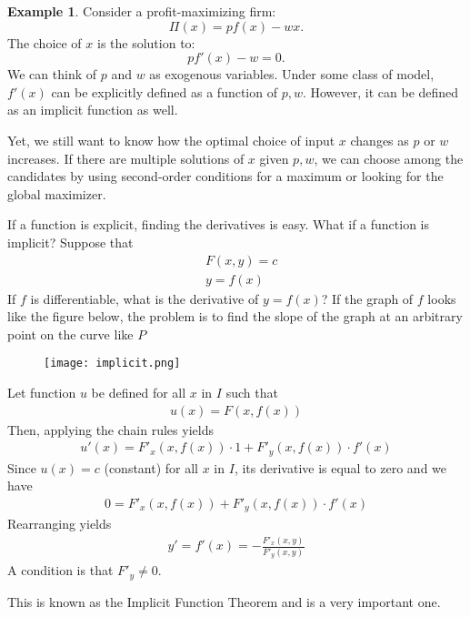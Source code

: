 \documentclass[10pt,a4paper]{book}
\theoremstyle{definition}\newtheorem{definition}{Definition}
\theoremstyle{definition}\newtheorem{fact}{Fact}
\theoremstyle{definition}\newtheorem{ex}{Ex.}
\theoremstyle{definition}\newtheorem{project}{Project}
\theoremstyle{definition}\newtheorem{problem}{Problem}
\theoremstyle{definition}\newtheorem{example}{Example}
\numberwithin{theorem}{chapter}
\numberwithin{corollary}{chapter}
\numberwithin{assumption}{chapter}
\numberwithin{definition}{chapter}
\numberwithin{prop}{chapter}
\numberwithin{notation}{chapter}
\numberwithin{problem}{chapter}
\numberwithin{example}{chapter}
\numberwithin{fact}{chapter}
\numberwithin{ex}{chapter}
\begin{document}
	\begin{example}
		Consider a profit-maximizing firm:
		\begin{equation*}
			\Pi(x) = p f(x) - wx.
		\end{equation*}
		The choice of $x$ is the solution to:
		\begin{equation*}
			p f'(x) - w = 0.
		\end{equation*}
		We can think of $p$ and $w$ as exogenous variables. Under some class of model, $f'(x)$ can be explicitly defined as a function of $p,w$. However, it can be defined as an implicit function as well. 
		
		Yet, we still want to know how the optimal choice of input $x$ changes as $p$ or $w$ increases. If there are multiple solutions of $x$ given $p,w$, we can choose among the candidates by using second-order conditions for a maximum or looking for the global maximizer.
	\end{example}
	If a function is explicit, finding the derivatives is easy. What if a function is implicit? Suppose that
	\begin{align*}
		& F(x,y) = c \\
		& y = f(x)   
	\end{align*}
	If $f$ is differentiable, what is the derivative of $y=f(x)$? If the graph of $f$ looks like the figure below, the problem is to find the slope of the graph at an arbitrary point on the curve like $P$
	\begin{figure}[ht]
		\centering
		\texttt{[image: implicit.png]}
	\end{figure}
	
	Let function $u$ be defined for all $x$ in $I$ such that
	\begin{align*}
		u(x) = F(x, f(x)) 
	\end{align*}
	Then, applying the chain rules yields
	\begin{align*}
		u'(x) = F'_x (x, f(x)) \cdot 1 + F'_y (x, f(x)) \cdot f'(x) 
	\end{align*}
	Since $u(x) = c$ (constant) for all $x$ in $I$, its derivative is equal to zero and we have
	\begin{align*}
		0 = F'_x (x, f(x)) + F'_y (x, f(x)) \cdot  f'(x) 
	\end{align*}
	Rearranging yields
	\begin{align*}
		y' = f'(x) = - \frac{F'_x (x,y)}{F'_y(x,y)} 
	\end{align*}
	A condition is that $F'_y \neq 0$.
	
	This is known as the Implicit Function Theorem and is a very important one.
	
\end{document}
